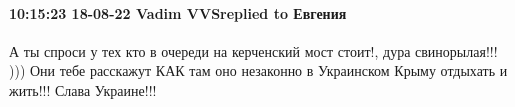  
 
 
 
 

\paragraph{10:15:23 18-08-22 Vadim VVSreplied to Евгения}

А ты спроси у тех кто в очереди на керченский мост стоит!, дура свинорылая!!!
))) Они тебе расскажут КАК там оно незаконно в Украинском Крыму отдыхать и
жить!!! Слава Украине!!!
